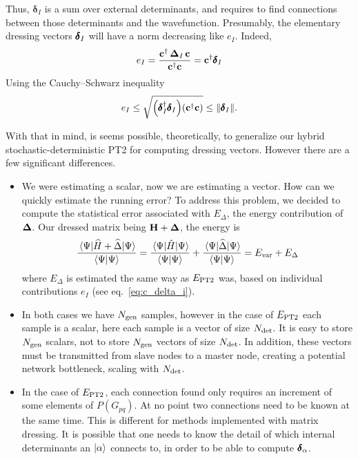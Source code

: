 \documentclass[./thesis.tex]{subfiles}
\begin{document}
Thus, ${\pmb \delta}_I$ is a sum over external determinants, and requires to find connections between those determinants and the wavefunction. Presumably, the elementary dressing vectors $\pmb \delta_I$ will have a norm decreasing like $e_I$. Indeed, 
\begin{equation}
e_I = \frac{{\bf c}^\dagger\, {\bf \Delta}_I\, {\bf c}}{{\bf c}^\dagger {\bf c}} = {\bf c}^\dagger \pmb \delta_I
\label{eq:c_delta_i}
\end{equation}
Using the Cauchy–Schwarz inequality
\begin{equation}
e_I \le \sqrt{ \qty (\pmb \delta_I^\dagger \pmb \delta_I) \qty({\bf c}^\dagger {\bf c}) } \le
\norm{\pmb \delta_I}.
\end{equation}

With that in mind, is seems possible, theoretically, to generalize our hybrid stochastic-deterministic PT2 for computing dressing vectors.
However there are a few significant differences.
\begin{itemize}
\item
We were estimating a scalar, now we are estimating a vector. How can we quickly estimate the running error?
To address this problem, we decided to compute the statistical error associated with $E_{\Delta}$, the energy contribution of ${\bf \Delta}$. Our dressed matrix being $\mathbf{H} + {\bf \Delta}$, the energy is
\begin{equation}
\frac{\mel{\Psi}{\widehat{H} + \widehat{\Delta}}{\Psi}}{\braket{\Psi}{\Psi}} =
\frac{ \mel{\Psi}{\hat{H}}{\Psi}}{\braket{\Psi}{\Psi}} + \frac{\mel{\Psi}{\widehat{\Delta}}{\Psi}}{\braket{\Psi}{\Psi}} = E_\text{var} + E_{\Delta} 
\end{equation}
where $E_{\Delta}$ is estimated the same way as $E_\text{PT2}$ was, based on individual contributions $e_I$ (see eq.~\eqref{eq:c_delta_i}).
\item
In both cases we have ${N_\text{gen}}$ samples, however in the case of $E_\text{PT2}$ each sample is a scalar, here each sample is a vector of size ${N_\text{det}}$. It is easy to store ${N_\text{gen}}$ scalars, not to store ${N_\text{gen}}$ vectors of size ${N_\text{det}}$. In addition, these vectors must be transmitted from slave nodes to a master node, creating a potential network bottleneck, scaling with ${N_\text{det}}$.
\item
In the case of $E_\text{PT2}$, each connection found only requires an increment of some elements of $P(G_{pq})$. At no point two connections need to be known at the same time. This is different for methods implemented with matrix dressing. It is possible that one needs to know the detail of which internal determinants an $\ket \alpha$ connects to, in order to be able to compute $\pmb \delta_\alpha$.
\end{itemize}
\end{document}
